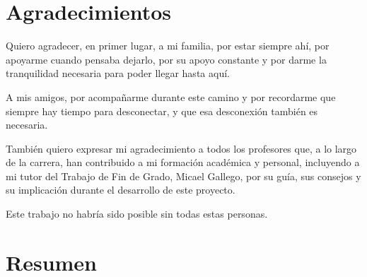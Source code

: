 \documentclass[11pt,twoside,titlepage]{report}
\begin{document}
\pagestyle{plain}





\setlength{\parskip}{0.75em}
\renewcommand{\baselinestretch}{1.25}

\setcounter{page}{2}





\chapter*{Agradecimientos}

Quiero agradecer, en primer lugar, a mi familia, por estar siempre ahí, por apoyarme cuando pensaba dejarlo, por su apoyo constante y por darme la tranquilidad necesaria para poder llegar hasta aquí.

A mis amigos, por acompañarme durante este camino y por recordarme que siempre hay tiempo para desconectar, y que esa desconexión también es necesaria.

También quiero expresar mi agradecimiento a todos los profesores que, a lo largo de la carrera, han contribuido a mi formación académica y personal, incluyendo a mi tutor del Trabajo de Fin de Grado, Micael Gallego, por su guía, sus consejos y su implicación durante el desarrollo de este proyecto.

Este trabajo no habría sido posible sin todas estas personas.




\afterpage{\blankpage}




\chapter*{Resumen}
\end{document}
